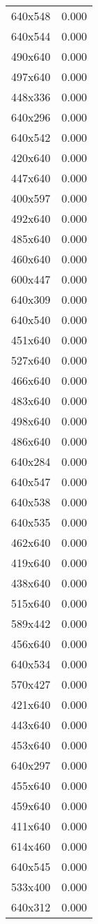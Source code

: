 \begin{table}
\begin{tabular}{lr}
640x548 & 0.000 \\
640x544 & 0.000 \\
490x640 & 0.000 \\
497x640 & 0.000 \\
448x336 & 0.000 \\
640x296 & 0.000 \\
640x542 & 0.000 \\
420x640 & 0.000 \\
447x640 & 0.000 \\
400x597 & 0.000 \\
492x640 & 0.000 \\
485x640 & 0.000 \\
460x640 & 0.000 \\
600x447 & 0.000 \\
640x309 & 0.000 \\
640x540 & 0.000 \\
451x640 & 0.000 \\
527x640 & 0.000 \\
466x640 & 0.000 \\
483x640 & 0.000 \\
498x640 & 0.000 \\
486x640 & 0.000 \\
640x284 & 0.000 \\
640x547 & 0.000 \\
640x538 & 0.000 \\
640x535 & 0.000 \\
462x640 & 0.000 \\
419x640 & 0.000 \\
438x640 & 0.000 \\
515x640 & 0.000 \\
589x442 & 0.000 \\
456x640 & 0.000 \\
640x534 & 0.000 \\
570x427 & 0.000 \\
421x640 & 0.000 \\
443x640 & 0.000 \\
453x640 & 0.000 \\
640x297 & 0.000 \\
455x640 & 0.000 \\
459x640 & 0.000 \\
411x640 & 0.000 \\
614x460 & 0.000 \\
640x545 & 0.000 \\
533x400 & 0.000 \\
640x312 & 0.000 \\

\end{tabular}
\end{table}
